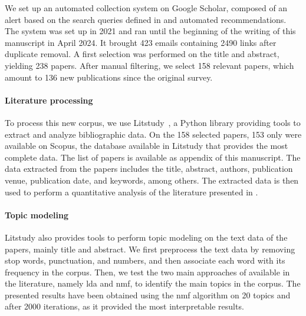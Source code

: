 We set up an automated collection system on Google Scholar, composed of an alert based on the search queries defined in  and automated recommendations.
The system was set up in 2021 and ran until the beginning of the writing of this manuscript in April 2024. 
It brought 423 emails containing 2490 links after duplicate removal.
A first selection was performed on the title and abstract, yielding 238 papers.
After manual filtering, we select 158 relevant papers, which amount to 136 new publications since the original survey.

\paragraph{Literature processing}

To process this new corpus, we use Litstudy~\cite{heldens_litstudyPythonpackage_2022}, a Python library providing tools to extract and analyze bibliographic data.
On the 158 selected papers, 153 only were available on Scopus, the database available in Litstudy that provides the most complete data.
The list of papers is available as appendix of this manuscript.
The data extracted from the papers includes the title, abstract, authors, publication venue, publication date, and keywords, among others.
The extracted data is then used to perform a quantitative analysis of the literature presented in .

\paragraph{Topic modeling}

Litstudy also provides tools to perform topic modeling on the text data of the papers, mainly title and abstract.
We first preprocess the text data by removing stop words, punctuation, and numbers, and then associate each word with its frequency in the corpus.
Then, we test the two main approaches of available in the literature, namely \gls{lda} and \gls{nmf}, to identify the main topics in the corpus.
The presented results have been obtained using the \gls{nmf} algorithm on 20 topics and after 2000 iterations, as it provided the most interpretable results.

